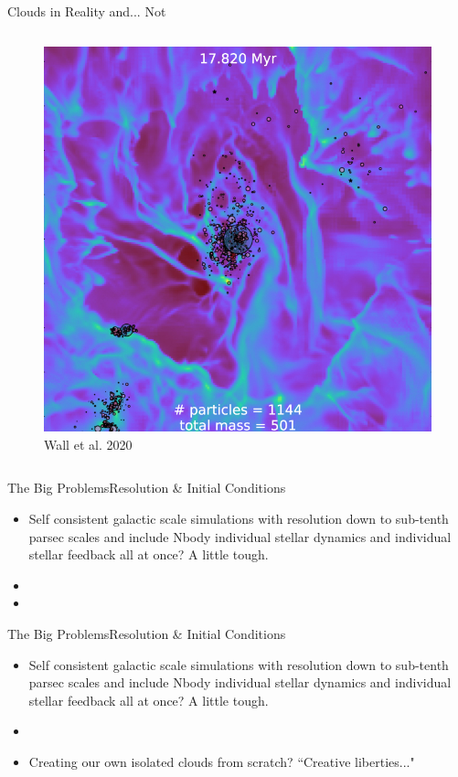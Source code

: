 \documentclass[aspectratio=169]{beamer}
\begin{document}
\begin{frame}{Clouds in Reality and... Not}{}
\begin{columns}
\begin{column}{0.35\textwidth}
\begin{figure}[h!]
                \includegraphics[width=\linewidth]{../images/josh_torch_run.jpeg} \\
                Wall et al. 2020
                \label{fig:torch}
            \end{figure}
        \end{column}
    \end{columns}
\end{frame} 
%
%
%
%
%
\begin{frame}{The Big Problems}{Resolution \& Initial Conditions}
    \begin{itemize}
        \item Self consistent galactic scale simulations with resolution down to sub-tenth parsec scales and include Nbody individual stellar dynamics and individual stellar feedback all at once? A little tough.
        \item []
        \item []
    \end{itemize}
\end{frame}
%
%
%
%
% 
\begin{frame}{The Big Problems}{Resolution \& Initial Conditions}
    \begin{itemize}
        \item Self consistent galactic scale simulations with resolution down to sub-tenth parsec scales and include Nbody individual stellar dynamics and individual stellar feedback all at once? A little tough.
        \item []
        \item Creating our own isolated clouds from scratch? ``Creative liberties..."
    \end{itemize}
\end{frame}
%
%
%
\end{document}
